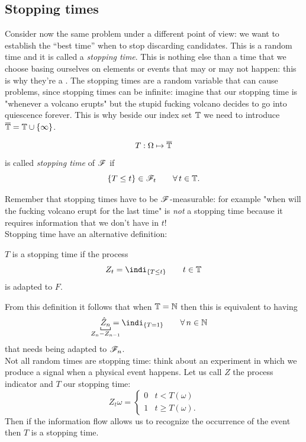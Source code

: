 \documentclass{report}
\begin{document}
\subsection{Stopping times}
Consider now the same problem under a different point of view: we want to establish the ``best time'' when to stop discarding candidates. This is a random time and it is called a \emph{stopping time}. This is nothing else than a time that we choose basing ourselves on elements or events that may or may not happen: this is why they're a \rv. The stopping times are a random variable that can cause problems, since stopping times can be infinite: imagine that our stopping time is "whenever a volcano erupts" but the stupid fucking volcano decides to go into quiescence forever. This is why beside our index set $\mathbb{T}$ we need to introduce $\overline{\mathbb{T}}=\mathbb{T}\cup\{\infty\}$.
\begin{definition}
	\[T:\Omega\mapsto\overline{\mathbb{T}}
	\]
	is called \emph{stopping time} of $\mathscr{F}$ if
	\[\{T\leq t\}\in\mathscr{F}_t\qquad\forall\, t\in\mathbb{T}.\]
\end{definition}
Remember that stopping times have to be $\mathscr{F}$-measurable: for example "when will the fucking volcano erupt for the last time" is \textit{not} a stopping time because it requires information that we don't have in $t$! \\
Stopping time have an alternative definition:
\begin{definition}
	$T$ is a stopping time if the process
	\[Z_t=\indi_{\{T\leq t\}}\qquad t\in\T\]
	is adapted to $F$.
\end{definition}
From this definition it follows that when $\mathbb{T}=\mathbb{N}$ then this is equivalent to having
\[\underbracket[0.6pt]{\hat{Z}_{n}}_{\mathclap{Z_n-Z_{n-1}}}=\indi_{\{T=1\}}\qquad\every n\in\N\]
that needs being adapted to $\mathscr{F}_n$.\\
Not all random times are stopping time: think about an experiment in which we produce a signal when a physical event happens. Let us call $Z$ the process indicator and $T$ our stopping time:
\[Z_t{\omega}=\begin{cases}
	0&t<T(\omega)\\
	1&t\geq T(\omega).
\end{cases}\]
Then if the information flow allows us to recognize the occurrence of the event then $T$ is a stopping time.
\end{document}
